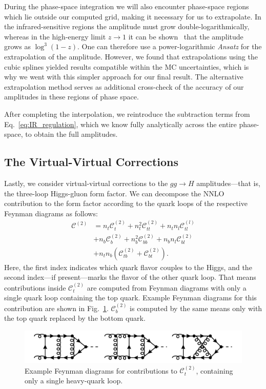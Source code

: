 During the phase-space integration we will also encounter phase-space regions which lie outside our computed grid, making it necessary for us to extrapolate. In the infrared-sensitive regions the amplitude must grow double-logarithmically, whereas in the high-energy limit $z \rightarrow 1$ it can be shown~\cite{Marzani:2008az, Harlander:2009my} that the amplitude grows as $\log^3(1 - z)$. One can therefore use a power-logarithmic \textit{Ansatz} for the extrapolation of the amplitude. However, we found that extrapolations using the cubic splines yielded results compatible within the \acs{MC} uncertainties, which is why we went with this simpler approach for our final result. The alternative extrapolation method serves as additional cross-check of the accuracy of our amplitudes in these regions of phase space.

After completing the interpolation, we reintroduce the subtraction terms from Eq.~\eqref{eq:IR_regulation}, which we know fully analytically across the entire phase-space, to obtain the full amplitudes.

\subsection{The Virtual-Virtual Corrections} \label{subsec:5:virtual_virtual_corrections}
Lastly, we consider virtual-virtual corrections to the $gg \longrightarrow H$ amplitudes---that is, the three-loop Higgs-gluon form factor. We can decompose the \acs{NNLO} contribution to the form factor according to the quark loops of the respective Feynman diagrams as follows:
\begin{equation}
\begin{split}
\mathcal{C}^{(2)} &=  n_t \mathcal{C}_t^{(2)} + n_t^2 \mathcal{C}_{tt}^{(2)} + n_t n_l \mathcal{C}_{tl}^{(l)} \\
& + n_b \mathcal{C}_b^{(2)} + n_b^2 \mathcal{C}_{bb}^{(2)} + n_b n_l \mathcal{C}_{bl}^{(2)} \\
& + n_t n_b \left( \mathcal{C}_{tb}^{(2)} + \mathcal{C}_{bt}^{(2)} \right).
\end{split}
\end{equation}
Here, the first index indicates which quark flavor couples to the Higgs, and the second index---if present---marks the flavor of the other quark loop.
That means contributions inside $\mathcal{C}_t^{(2)}$ are computed from Feynman diagrams with only a single quark loop containing the top quark. Example Feynman diagrams for this contribution are shown in Fig.~\ref{fig:5:C_t}. $\mathcal{C}_{b}^{(2)}$ is computed by the same means only with the top quark replaced by the bottom quark.
\begin{figure}[ht]
\centering
\includegraphics[width=\figurewidth]{Images/NNLO_Feynman_diagrams/C_t.pdf}
\caption{Example Feynman diagrams for contributions to $\mathcal{C}^{(2)}_{t}$, containing only a single heavy-quark loop.}
\label{fig:5:C_t}
\end{figure}

